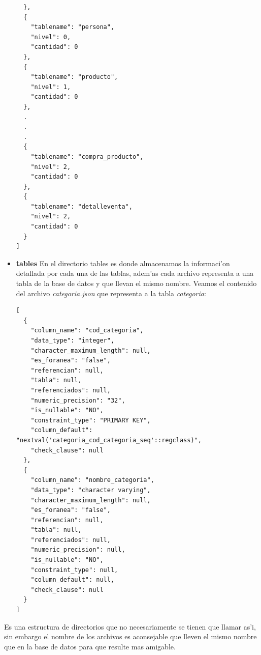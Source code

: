 \begin{itemize}
\begin{lstlisting}
  },
  {
    "tablename": "persona",
    "nivel": 0,
    "cantidad": 0
  },
  {
    "tablename": "producto",
    "nivel": 1,
    "cantidad": 0
  },
  .
  .
  .
  {
    "tablename": "compra_producto",
    "nivel": 2,
    "cantidad": 0
  },
  {
    "tablename": "detalleventa",
    "nivel": 2,
    "cantidad": 0
  }
]
\end{lstlisting}  
\item \textbf{tables} En el directorio tables es donde almacenamos la informaci'on detallada por cada una de las tablas, adem'as cada archivo representa a una tabla de la base de datos y que llevan el mismo nombre. Veamos el contenido del archivo \textit{categoria.json} que representa a la tabla \textit{categoria}:
\lstset{language=java,breaklines=true}
\label{tablaCompraProductoArchivoControl}
\begin{lstlisting}
[
  {
    "column_name": "cod_categoria",
    "data_type": "integer",
    "character_maximum_length": null,
    "es_foranea": "false",
    "referencian": null,
    "tabla": null,
    "referenciados": null,
    "numeric_precision": "32",
    "is_nullable": "NO",
    "constraint_type": "PRIMARY KEY",
    "column_default": "nextval('categoria_cod_categoria_seq'::regclass)",
    "check_clause": null
  },
  {
    "column_name": "nombre_categoria",
    "data_type": "character varying",
    "character_maximum_length": null,
    "es_foranea": "false",
    "referencian": null,
    "tabla": null,
    "referenciados": null,
    "numeric_precision": null,
    "is_nullable": "NO",
    "constraint_type": null,
    "column_default": null,
    "check_clause": null
  }
]
\end{lstlisting} 
\end{itemize}

Es una estructura de directorios que no necesariamente se tienen que llamar as'i, sin embargo el nombre de los archivos es aconsejable que lleven el mismo nombre que en la base de datos para que resulte mas amigable.

